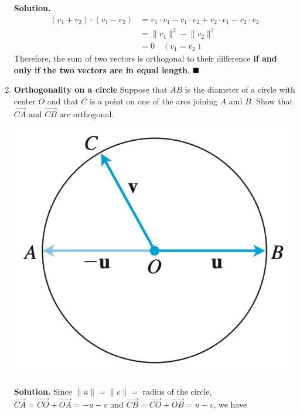 \documentclass{report}
\begin{document}
\begin{enumerate}
          \textbf{Solution.}
          \begin{align*}
              (v_1 + v_2) \cdot (v_1 - v_2) & = v_1 \cdot v_1 - v_1 \cdot v_2 + v_2 \cdot v_1 - v_2 \cdot v_2 \\
                                            & = \lVert v_1 \rVert^2 - \lVert v_2 \rVert^2                     \\
                                            & = 0 \quad (v_1 = v_2)
          \end{align*}
          Therefore, the sum of two vectors is orthogonal to their difference \textbf{if and only if the two vectors are in equal length}. $\hfill\blacksquare$

          \newpage
    \item \textbf{Orthogonality on a circle} Suppose that $A B$ is the diameter of a circle with
          center $O$ and that $C$ is a point on one of the arcs joining $A$ and $B$. Show
          that $\overrightarrow{C A}$ and $\overrightarrow{C B}$ are orthogonal.
          \begin{center}
              \includegraphics[scale=0.4]{./assets/thomas12.3q20.png}
          \end{center}
          \textbf{Solution. }Since $\lVert u \rVert = \lVert v \rVert = $ radius of the circle, $\overrightarrow{C A} = \overrightarrow{CO} + \overrightarrow{OA} = -u - v$ and $\overrightarrow{C B} = \overrightarrow{CO} + \overrightarrow{OB} = u - v$, we have
          \begin{align*}

\end{align*}
\end{enumerate}
\end{document}
